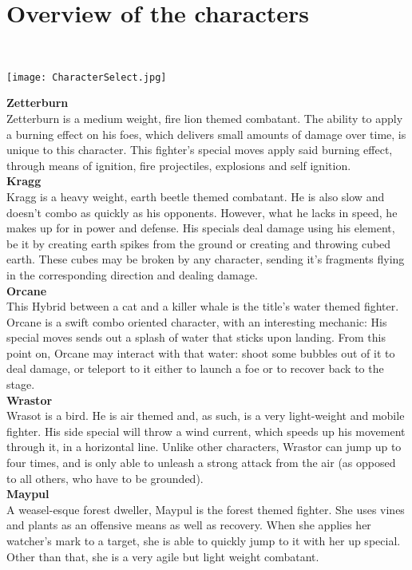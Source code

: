 \documentclass{article}
\begin{document}
\newpage

\chapter{\textbf{Overview of the characters}}\\
\begin{center}
\texttt{[image: CharacterSelect.jpg]}
\end{center}

\textbf{Zetterburn}\\
Zetterburn is a medium weight, fire lion themed combatant. The ability to apply a burning effect on his foes, which delivers small amounts of damage over time, is unique to this character. This fighter's special moves apply said burning effect, through means of ignition, fire projectiles, explosions and self ignition.\\
\textbf{Kragg}\\
Kragg is a heavy weight, earth beetle themed combatant. He is also slow and doesn't combo as quickly as his opponents. However, what he lacks in speed, he makes up for in power and defense. His specials deal damage using his element, be it by creating earth spikes from the ground or creating and throwing cubed earth. These cubes may be broken by any character, sending it's fragments flying in the corresponding direction and dealing damage.\\
\textbf{Orcane}\\
This Hybrid between a cat and a killer whale is the title's water themed fighter. Orcane is a swift combo oriented character, with an interesting mechanic: His special moves sends out a splash of water that sticks upon landing. From this point on, Orcane may interact with that water: shoot some bubbles out of it to deal damage, or teleport to it either to launch a foe or to recover back to the stage.\\
\textbf{Wrastor}\\
Wrasot is a bird. He is air themed and, as such, is a very light-weight and mobile fighter. His side special will throw a wind current, which speeds up his movement through it, in a horizontal line. Unlike other characters, Wrastor can jump up to four times, and is only able to unleash a strong attack from the air (as opposed to all others, who have to be grounded).
\\
\textbf{Maypul}\\
A weasel-esque forest dweller, Maypul is the forest themed fighter. She uses vines and plants as an offensive means as well as recovery. When she applies her watcher's mark to a target, she is able to quickly jump to it with her up special. Other than that, she is a very agile but light weight combatant.
\end{document}

